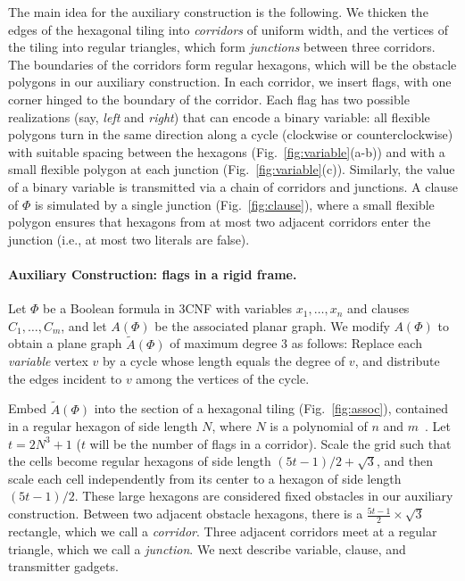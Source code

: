 The main idea for the auxiliary construction is the following. We thicken the edges of the hexagonal tiling into \emph{corridors} of uniform width, and the vertices of the tiling into regular triangles, which form \emph{junctions} between three corridors. The boundaries of the corridors form regular hexagons, which will be the obstacle polygons in our auxiliary construction. In each corridor, we insert flags, with one corner hinged to the boundary of the corridor. Each flag has two possible realizations (say, \emph{left} and \emph{right}) that can encode a binary variable: all flexible polygons turn in the same direction along a cycle (clockwise or counterclockwise) with suitable spacing between the hexagons (Fig.~\ref{fig:variable}(a-b)) and with a small flexible polygon at each junction (Fig.~\ref{fig:variable}(c)). Similarly, the value of a binary variable is transmitted via a chain of corridors and junctions. A clause of $\Phi$ is simulated by a single junction (Fig.~\ref{fig:clause}), where a small flexible polygon ensures that hexagons from at most two adjacent corridors enter the junction (i.e., at most two literals are false).

\paragraph{Auxiliary Construction: flags in a rigid frame.}
Let $\Phi$ be a Boolean formula in 3CNF with variables $x_1,\ldots , x_n$ and clauses $C_1,\ldots ,C_m$, and let $A(\Phi)$ be the associated planar graph. We modify $A(\Phi)$ to obtain a plane graph $\tilde{A}(\Phi)$ of maximum degree 3 as follows: Replace each \emph{variable} vertex $v$ by a cycle whose length equals the degree of $v$, and distribute the edges incident to $v$ among the vertices of the cycle.

Embed $\tilde{A}(\Phi)$ into the section of a hexagonal tiling (Fig.~\ref{fig:assoc}), contained in a regular hexagon of side length $N$, where $N$ is a polynomial of $n$ and $m$~\cite{BK+98}. Let $t=2N^3+1$ ($t$ will be the number of flags in a corridor). Scale the grid such that the cells become regular hexagons of side length $(5t-1)/2+\sqrt{3}$, and then scale each cell independently from its center to a hexagon of side length $(5t-1)/2$. These large hexagons are considered fixed obstacles in our auxiliary construction. Between two adjacent obstacle hexagons, there is a $\frac{5t-1}{2}\times \sqrt{3}$ rectangle, which we call a \emph{corridor}. Three adjacent corridors meet at a regular triangle, which we call a \emph{junction}. We next describe variable, clause, and transmitter gadgets.

